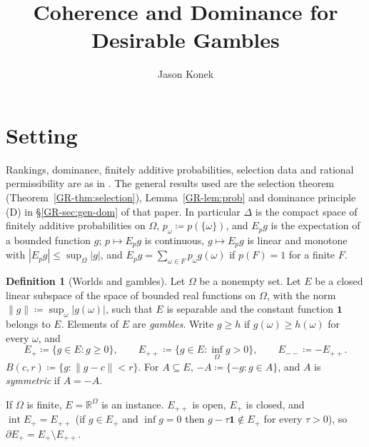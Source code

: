 \documentclass[11pt]{article}
\title{Coherence and Dominance for Desirable Gambles}
\author{Jason Konek}
\date{}
\newcommand{\chg}[1]{{\color{red}#1}}
\theoremstyle{definition}
\newtheorem{definition}[theorem]{Definition}
\theoremstyle{remark}
\newcommand{\one}{\mathbf 1}
\newcommand{\R}{\mathbb R}
\newcommand{\interior}{\operatorname{int}}
\newcommand{\bd}{\partial}
\begin{document}
\maketitle


\section{Setting}\label{sec:setting}

Rankings, dominance, finitely additive probabilities, selection data and rational permissibility are as in \cite{KonekGR}. \chg{The general results used are the selection theorem (Theorem~\ref{GR-thm:selection}), Lemma~\ref{GR-lem:prob} and dominance principle (D) in \S\ref{GR-sec:gen-dom} of that paper.} In particular $\Delta$ is the compact space of finitely additive probabilities on $\Omega$, $p_\omega\coloneqq p(\{\omega\})$, and $E_pg$ is the expectation of a bounded function $g$; $p\mapsto E_pg$ is continuous, $g\mapsto E_pg$ is linear and monotone with $|E_pg|\le\sup_\Omega|g|$, and $E_pg=\sum_{\omega\in F}p_\omega g(\omega)$ if $p(F)=1$ for a finite $F$.

\begin{definition}[Worlds and gambles]\label{def:gambles}
Let $\Omega$ be a nonempty set. Let $E$ be a closed linear subspace of the space of bounded real functions on $\Omega$, with the norm $\|g\|\coloneqq\sup_{\omega}|g(\omega)|$, such that $E$ is separable and the constant function $\one$ belongs to $E$. Elements of $E$ are \emph{gambles}. Write $g\ge h$ if $g(\omega)\ge h(\omega)$ for every $\omega$, and
\[
E_+\coloneqq\{g\in E:g\ge0\},\qquad E_{++}\coloneqq\{g\in E:\inf_\Omega g>0\},\qquad E_{--}\coloneqq-E_{++}.
\]
$B(c,r)\coloneqq\{g:\|g-c\|<r\}$. For $A\subseteq E$, $-A\coloneqq\{-g:g\in A\}$, and $A$ is \emph{symmetric} if $A=-A$.
\end{definition}

If $\Omega$ is finite, $E=\R^\Omega$ is an instance. $E_{++}$ is open, $E_+$ is closed, and $\interior E_+=E_{++}$ (if $g\in E_+$ and $\inf g=0$ then $g-\tau\one\notin E_+$ for every $\tau>0$), so $\bd E_+=E_+\setminus E_{++}$.
\end{document}
